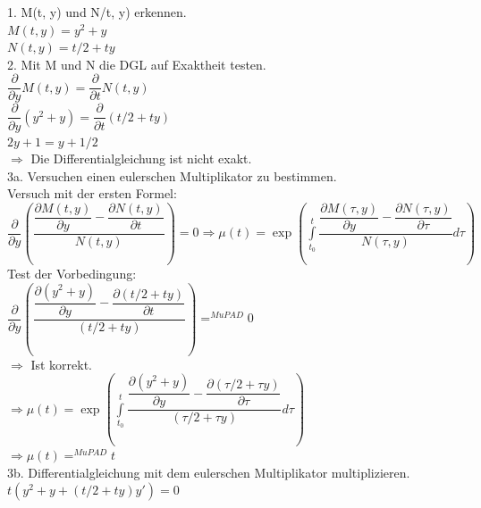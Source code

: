 \documentclass[11pt,final]{scrreprt}
\begin{document}
1. M(t, y) und N/t, y) erkennen.\\

$M(t, y) = y^2+y $\\
$N(t, y) = t/2 + ty$\\

2. Mit M und N die DGL auf Exaktheit testen.\\

$\dfrac{\partial}{\partial y}M(t, y) = \dfrac{\partial}{\partial t} N(t, y)$\\
$\dfrac{\partial}{\partial y} (y^2+y)  = \dfrac{\partial}{\partial t} (t/2 + ty)$\\

$2y+1 = y + 1/2$\\
$\Rightarrow$ Die Differentialgleichung ist nicht exakt.\\

3a. Versuchen einen eulerschen Multiplikator zu bestimmen.\\

Versuch mit der ersten Formel:\\

$ \dfrac{\partial}{\partial y} \left( \dfrac{\dfrac{\partial M(t, y)}{\partial y}-\dfrac{\partial N(t, y)}{\partial t}}{N(t, y)} \right) = 0 \Rightarrow \mu(t) = \exp \left( \int\limits_{t_0}^t \dfrac{\dfrac{\partial M(\tau, y)}{\partial y}-\dfrac{\partial N(\tau, y)}{\partial \tau}}{N(\tau, y)} d\tau\right)$\\

Test der Vorbedingung:\\

$ \dfrac{\partial}{\partial y} \left( \dfrac{\dfrac{\partial (y^2+y)}{\partial y}-\dfrac{\partial (t/2 + ty)}{\partial t}}{(t/2 + ty)} \right) =^{MuPAD} 0$\\

$\Rightarrow$ Ist korrekt.\\

$ \Rightarrow \mu(t) = \exp \left( \int\limits_{t_0}^t \dfrac{\dfrac{\partial (y^2+y)}{\partial y}-\dfrac{\partial (\tau/2 + \tau y)}{\partial \tau}}{(\tau/2 + \tau y)} d\tau\right)$\\
$ \Rightarrow \mu(t) =^{MuPAD} t$\\

3b. Differentialgleichung mit dem eulerschen Multiplikator multiplizieren.\\

$ t(y^2+y+(t/2+ty)y') = 0 $\\
\end{document}

